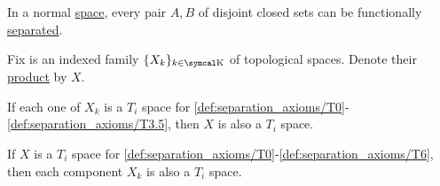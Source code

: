 \begin{Lemma}\label{thm:urysohns_lemma}\cite[1.5.11]{Engelking1989}
  In a normal \hyperref[def:separation_axioms/T4]{space}, every pair \( A, B \) of disjoint closed sets can be functionally \hyperref[def:topological_space_separation]{separated}.
\end{Lemma}

\begin{Theorem}\label{thm:separation_axioms_of_product}
  Fix is an indexed family \( \{ X_k \}_{k \in \CK} \) of topological spaces. Denote their \hyperref[def:topological_product]{product} by \( X \).

  \begin{ThmEnum}
    \cite[theorem 2.3.11]{Engelking1989} If each one of \( X_k \) is a \( T_i \) space for \ref{def:separation_axioms/T0}-\ref{def:separation_axioms/T3.5}, then \( X \) is also a \( T_i \) space.

    \cite[theorem 2.3.11]{Engelking1989} If \( X \) is a \( T_i \) space for \ref{def:separation_axioms/T0}-\ref{def:separation_axioms/T6}, then each component \( X_k \) is also a \( T_i \) space.
  \end{ThmEnum}
\end{Theorem}
